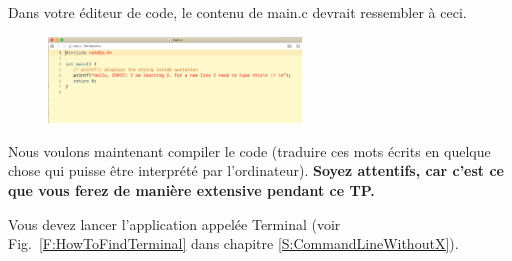 \documentclass{article}
\newcommand\fig[1]{{Fig.~\ref{#1}}}
\begin{document}
Dans votre éditeur de code, le contenu de main.c devrait ressembler à ceci.
\begin{figure}[H]
\center
\includegraphics[width=0.6\textwidth]{Plots/ContentMain.png}
\end{figure}
Nous voulons maintenant compiler le code (traduire ces mots écrits en quelque chose qui puisse être interprété par l'ordinateur). {\color{Bittersweet}\textbf{Soyez attentifs, car c'est ce que vous ferez de manière extensive pendant ce TP.}}

Vous devez lancer l'application appelée Terminal (voir \fig{F:HowToFindTerminal} dans chapitre \ref{S:CommandLineWithoutX}).
\end{document}
